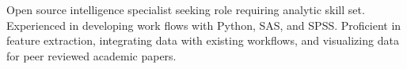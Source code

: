 \documentclass[letter,10pt]{article}
\begin{document}
Open source intelligence specialist seeking role requiring analytic skill set. Experienced in developing work flows with Python, SAS, and SPSS. Proficient in feature extraction, integrating data with existing workflows, and visualizing data for peer reviewed academic papers.
\end{document}

